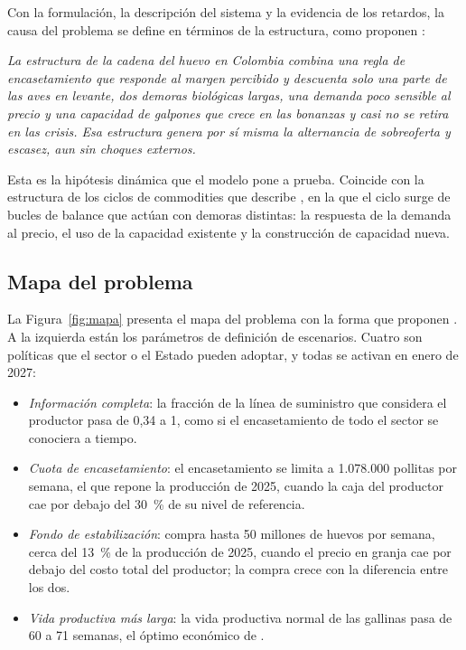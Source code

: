 \documentclass[preprint,12pt,authoryear]{elsarticle}
\begin{document}
Con la formulación, la descripción del sistema y la evidencia de los retardos, la causa del problema se define en términos de la estructura, como proponen \citet{RubianoVillarreal}:

\medskip
\noindent \textit{La estructura de la cadena del huevo en Colombia combina una regla de encasetamiento que responde al margen percibido y descuenta solo una parte de las aves en levante, dos demoras biológicas largas, una demanda poco sensible al precio y una capacidad de galpones que crece en las bonanzas y casi no se retira en las crisis. Esa estructura genera por sí misma la alternancia de sobreoferta y escasez, aun sin choques externos.}

\medskip
Esta es la hipótesis dinámica que el modelo pone a prueba. Coincide con la estructura de los ciclos de commodities que describe \citet{Sterman2000}, en la que el ciclo surge de bucles de balance que actúan con demoras distintas: la respuesta de la demanda al precio, el uso de la capacidad existente y la construcción de capacidad nueva.

\subsection{Mapa del problema}
\label{sec3.5}

La Figura~\ref{fig:mapa} presenta el mapa del problema con la forma que proponen \citet{RubianoVillarreal}. A la izquierda están los parámetros de definición de escenarios. Cuatro son políticas que el sector o el Estado pueden adoptar, y todas se activan en enero de 2027:
\begin{itemize}
\item \textit{Información completa}: la fracción de la línea de suministro que considera el productor pasa de 0,34 \citep{Sterman1989b} a 1, como si el encasetamiento de todo el sector se conociera a tiempo.
\item \textit{Cuota de encasetamiento}: el encasetamiento se limita a 1.078.000 pollitas por semana, el que repone la producción de 2025, cuando la caja del productor cae por debajo del 30~\% de su nivel de referencia.
\item \textit{Fondo de estabilización}: compra hasta 50 millones de huevos por semana, cerca del 13~\% de la producción de 2025, cuando el precio en granja cae por debajo del costo total del productor; la compra crece con la diferencia entre los dos.
\item \textit{Vida productiva más larga}: la vida productiva normal de las gallinas pasa de 60 a 71 semanas, el óptimo económico de \citet{TraoreDoyon2023}.
\end{itemize}
\end{document}
